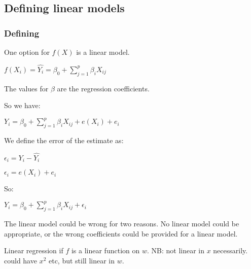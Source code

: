 
\subsection{Defining linear models}

\subsubsection{Defining}

One option for \(f(X)\) is a linear model.

\(f(X_i)=\hat{Y_i}= \beta_0+\sum_{j=1}^p\beta_iX_{ij}\)

The values for \(\beta \) are the regression coefficients.

So we have:

\(Y_i=\beta_0+\sum_{j=1}^p\beta_iX_{ij}+e(X_i)+e_i\)

We define the error of the estimate as:

\(\epsilon_i=Y_i-\hat{Y_i}\)

\(\epsilon_i=e(X_i)+e_i \)

So:

\(Y_i=\beta_0+\sum_{j=1}^p\beta_iX_{ij}+\epsilon_i\)

The linear model could be wrong for two reasons. No linear model could be appropriate, or the wrong coefficients could be provided for a linear model.

Linear regression if \(f\) is a linear function on \(w\). NB: not linear in \(x\) necessarily. could have \(x^2\) etc, but still linear in \(w\).

